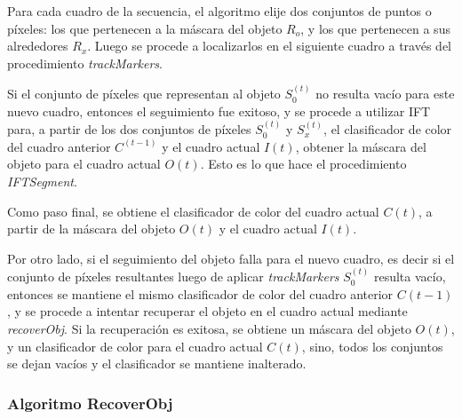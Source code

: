 \documentclass[a4paper,10pt]{article}
\begin{document}
Para cada cuadro de la secuencia, el algoritmo elije dos conjuntos de puntos o píxeles: los que pertenecen a la máscara del objeto $R_{o}$, y los que pertenecen a 
sus alrededores $R_{x}$. Luego se procede 
a localizarlos en el siguiente cuadro a través del procedimiento \textit{trackMarkers}. 

Si el conjunto de píxeles que representan al objeto $S_{0}^{(t)}$ no resulta vacío para este 
nuevo cuadro, entonces el seguimiento
fue exitoso, y se procede a utilizar IFT para, a partir de los dos conjuntos de píxeles $S_{0}^{(t)}$ y $S_{x}^{(t)}$, el clasificador de color del cuadro anterior $C^{(t-1)}$ 
y el cuadro actual $I{(t)}$, obtener la máscara del 
objeto para el cuadro actual $O{(t)}$. Esto es lo que hace el procedimiento \textit{IFTSegment}. 

Como paso final, se obtiene el clasificador de color del cuadro actual $C{(t)}$, a partir de la máscara del objeto $O{(t)}$ y el cuadro actual $I{(t)}$.

Por otro lado, si el seguimiento del objeto falla para el nuevo cuadro, es decir si el conjunto de píxeles resultantes luego de aplicar \textit{trackMarkers} $S_{0}^{(t)}$ 
resulta vacío, entonces se mantiene el mismo clasificador de color del cuadro anterior $C{(t-1)}$, y se procede
a intentar recuperar el objeto en el cuadro actual mediante \textit{recoverObj}. Si la recuperación
es exitosa, se obtiene un máscara del objeto $O{(t)}$, y un clasificador de color para el cuadro actual $C{(t)}$,
sino, todos los conjuntos se dejan vacíos y el clasificador se mantiene inalterado.\

\subsubsection{Algoritmo RecoverObj}
\end{document}
